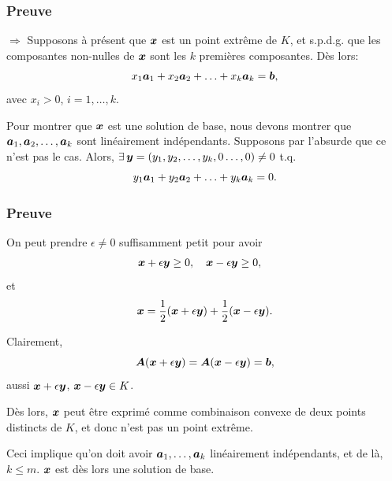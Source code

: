 \documentclass[usepdftitle=false]{beamer}
\begin{document}
\begin{frame}
\frametitle{Preuve}

$\Rightarrow$ Supposons à présent que ${\boldsymbol{x}}$ est un point extrême de $K$, et s.p.d.g. que les composantes non-nulles de ${\boldsymbol{x}}$ sont les $k$ premières composantes. Dès lors:
\[
x_1 {\boldsymbol{a}}_1 + x_2 {\boldsymbol{a}}_2 + \ldots + x_k {\boldsymbol{a}}_k = {\boldsymbol{b}},
\]
avec $x_i > 0$, $i = 1,\ldots,k$.

\mbox{}

Pour montrer que ${\boldsymbol{x}}$ est une solution de base, nous devons montrer que ${\boldsymbol{a}}_1, {\boldsymbol{a}}_2,\ldots, {\boldsymbol{a}}_k$ sont linéairement indépendants. Supposons par l'absurde que ce n'est pas le cas. Alors, $\exists\, {\boldsymbol{y}} = ( y_1, y_2,\ldots,y_k,0\ldots,0) \ne 0$ t.q.
\[
y_1 {\boldsymbol{a}}_1 + y_2 {\boldsymbol{a}}_2 + \ldots + y_k {\boldsymbol{a}}_k = 0.
\]

\end{frame}

\begin{frame}
\frametitle{Preuve}

On peut prendre $\epsilon \ne 0$ suffisamment petit pour avoir
\begin{align*}
{\boldsymbol{x}} + \epsilon {\boldsymbol{y}} &\geq 0, \quad
{\boldsymbol{x}} - \epsilon {\boldsymbol{y}} \geq 0,
\end{align*}
et
\[
  {\boldsymbol{x}} = \frac{1}{2}({\boldsymbol{x}} + \epsilon {\boldsymbol{y}}) + \frac{1}{2}({\boldsymbol{x}} - \epsilon {\boldsymbol{y}}).
\]

\mbox{}

Clairement,
\[
{\boldsymbol{A}}({\boldsymbol{x}} + \epsilon {\boldsymbol{y}}) = {\boldsymbol{A}}({\boldsymbol{x}} - \epsilon {\boldsymbol{y}}) = {\boldsymbol{b}},
\]
aussi ${\boldsymbol{x}} + \epsilon {\boldsymbol{y}}$, ${\boldsymbol{x}} - \epsilon {\boldsymbol{y}} \in K$.

\mbox{}

Dès lors, ${\boldsymbol{x}}$ peut être exprimé comme combinaison convexe de deux points distincts de $K$, et donc n'est pas un point extrême.

\mbox{}

Ceci implique qu'on doit avoir ${\boldsymbol{a}}_1,\ldots,{\boldsymbol{a}}_k$ linéairement indépendants, et de là, $k \leq m$. ${\boldsymbol{x}}$ est dès lors une solution de base.
\end{frame}
\end{document}
